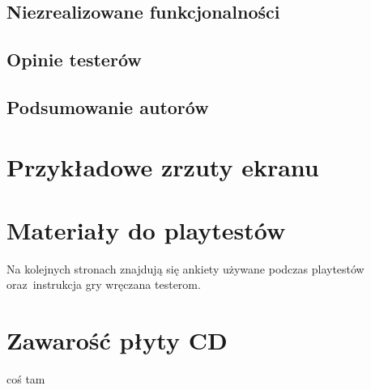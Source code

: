 \documentclass[licencjacka]{pracamgr}
\begin{document}
  \section{Niezrealizowane funkcjonalności}

  \section{Opinie testerów}

  \section{Podsumowanie autorów}

\appendix

  \chapter{Przykładowe zrzuty ekranu}

  \chapter{Materiały do playtestów}
  Na kolejnych stronach znajdują się ankiety używane podczas playtestów
  oraz~instrukcja gry wręczana testerom.

    
    

  \chapter{Zawarość płyty CD}


\begin{thebibliography}{99}

  \item{coś tam}

\end{thebibliography}
\end{document}
